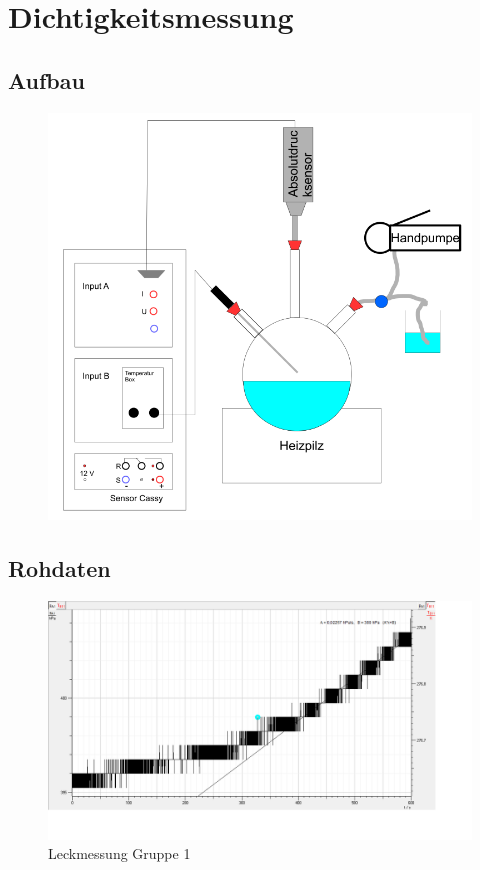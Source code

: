 \documentclass[11pt]{beamer}
\begin{document}
\section{Dichtigkeitsmessung}

\subsection{Aufbau}
\begin{frame}
\begin{figure}[H]
\centering
\includegraphics[scale=0.5]{Bilder/Versuchsskizze.PNG}
\end{figure}

\end{frame}

\subsection{Rohdaten}
\begin{frame}
\begin{figure}[H]
\centering
\includegraphics[scale=0.3]{Bilder/dichtigkeit_raw_JM.png}
\caption{Leckmessung Gruppe 1}
\end{figure}
\end{frame}
\end{document}
